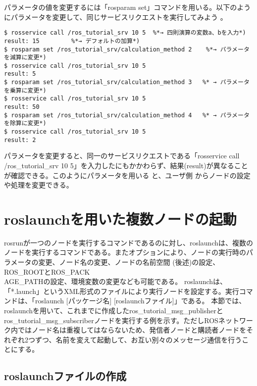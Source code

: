 パラメータの値を変更するには「rosparam set」コマンドを用いる。以下のようにパラメータを変更して、同じサービスリクエストを実行してみよう  。

\begin{lstlisting}[language=ROS]
$ rosservice call /ros_tutorial_srv 10 5  %*→ 四則演算の変数a、bを入力*)
result: 15         %*→ デフォルトの加算*)
$ rosparam set /ros_tutorial_srv/calculation_method 2    %*→ パラメータを減算に変更*)
$ rosservice call /ros_tutorial_srv 10 5
result: 5
$ rosparam set /ros_tutorial_srv/calculation_method 3   %* → パラメータを乗算に変更*)
$ rosservice call /ros_tutorial_srv 10 5
result: 50
$ rosparam set /ros_tutorial_srv/calculation_method 4   %* → パラメータを除算に変更*)
$ rosservice call /ros_tutorial_srv 10 5
result: 2
\end{lstlisting}

パラメータを変更すると、同一のサービスリクエストである「rosservice call /ros\_tutorial\_srv 10 5」を入力したにもかかわらず、結果(result)が異なることが確認できる。このようにパラメータを用いる  と、ユーザ側 からノードの設定や処理を変更できる。

\section{roslaunchを用いた複数ノードの起動}

rosrunが一つのノードを実行するコマンドであるのに対し、roslaunchは、複数のノードを実行するコマンドである。またオプションにより、ノードの実行時のパラメータの変更、ノード名の変更、ノードの名前空間  (後述)の設定、ROS\_ROOTとROS\_PACK\\AGE\_PATHの設定、環境変数の変更なども可能である。
roslaunchは、「*.launch」というXML形式のファイルにより実行ノードを設定する。実行コマンドは、「roslaunch [パッケージ名] [roslaunchファイル]」である。
本節では、roslaunchを用いて、これまでに作成したros\_tutorial\_msg\_publisherとros\_tutorial\_msg\_subscriberノードを実行する例を示す。ただしROSネットワーク内ではノード名は重複してはならないため、発信者ノードと購読者ノードをそれぞれ2つずつ、名前を変えて起動して、お互い別々のメッセージ通信を行うことにする。

\subsection{roslaunchファイルの作成}

